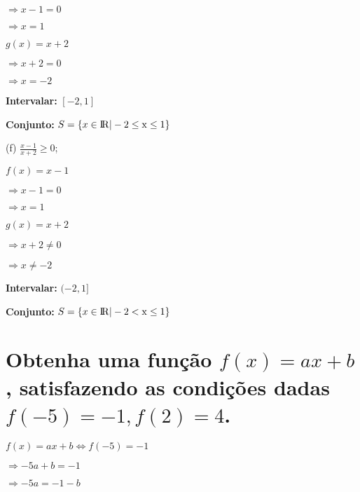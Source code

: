\documentclass{article}
\begin{document}
		\hspace{5mm}$ \Rightarrow x - 1 = 0 $

		\hspace{5mm}$ \Rightarrow x = 1$

		\hspace{5mm}$ g(x) = x + 2$

		\hspace{5mm}$ \Rightarrow x + 2 = 0 $

		\hspace{5mm}$ \Rightarrow x = -2$

		\hspace{5mm} \textbf{Intervalar:} $[-2, 1]$

		\hspace{5mm} \textbf{Conjunto:} $ S = \{x \in \rm I\!R | -2 \leq x \leq 1 \}$

		\vspace{5mm}
		(f) $\frac {x - 1}{x + 2} \geq 0$;

		\hspace{5mm}$ f(x) = x - 1$

		\hspace{5mm}$ \Rightarrow x - 1 = 0 $

		\hspace{5mm}$ \Rightarrow x = 1$

		\hspace{5mm}$ g(x) = x + 2$

		\hspace{5mm}$ \Rightarrow x + 2 \neq 0 $

		\hspace{5mm}$ \Rightarrow x \neq -2$

		\hspace{5mm} \textbf{Intervalar:} $(-2, 1]$

		\hspace{5mm} \textbf{Conjunto:} $ S = \{x \in \rm I\!R | -2 < x \leq 1 \}$

	\section{Obtenha uma função $f(x) = ax + b$, satisfazendo as condições dadas $f(-5) = -1, f(2) = 4$.}

		\hspace{5mm} $f(x) = ax + b \Leftrightarrow f(-5) = -1$

		$\Rightarrow -5a + b = -1$

		$\Rightarrow -5a = -1 - b$

\end{document}
